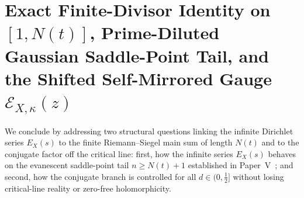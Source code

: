 \documentclass[11pt,reqno]{amsart}
\theoremstyle{definition}
\theoremstyle{remark}
\numberwithin{equation}{section}
\begin{document}
\section{Exact Finite-Divisor Identity on $[1, N(t)]$, Prime-Diluted Gaussian Saddle-Point Tail, and the Shifted Self-Mirrored Gauge $\mathcal{E}_{X,\kappa}(z)$}\label{sec:finite_divisor_shifted}

We conclude by addressing two structural questions linking the infinite Dirichlet series $E_X(s)$ to the finite Riemann--Siegel main sum of length $N(t)$ and to the conjugate factor off the critical line: first, how the infinite series $E_X(s)$ behaves on the evanescent saddle-point tail $n \ge N(t) + 1$ established in Paper~V~\cite{missiaen2026paper5}; and second, how the conjugate branch is controlled for all $d \in (0, \frac{1}{2}]$ without losing critical-line reality or zero-free holomorphicity.
\end{document}
